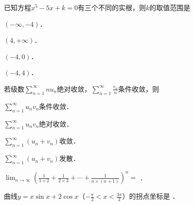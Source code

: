 \documentclass[plain,noanswer,medmath]{../../template/jnuexam}
\begin{document}








\begin{problem}
已知方程$x^5 - 5x + k = 0$有三个不同的实根，则$k$的取值范围是\pickout{}
\begin{abcd}
\item $(-\infty , - 4)$．
\item $(4, +\infty)$．
\item $(- 4,0)$．
\item $(- 4,4)$．
\end{abcd}
\end{problem}




\begin{problem}
若级数$\sum_{n = 1}^{\infty}nu_n$绝对收敛，$\sum_{n = 1}^{\infty}\frac{v_n}{n}$条件收敛，则\pickout{}
\begin{abcd}
\item $\sum_{n = 1}^{\infty}u_n v_n$条件收敛．
\item $\sum_{n = 1}^{\infty}u_n v_n$绝对收敛．
\item $\sum_{n = 1}^{\infty}(u_n + v_n)$收敛．
\item $\sum_{n = 1}^{\infty}(u_n + v_n)$发散．
\end{abcd}
\end{problem}












\begin{problem}
$\lim_{n \to \infty} \left(\frac{1}{1 \times 2} + \frac{1}{2 \times 3} + \cdots
 + \frac{1}{n \times(n + 1)} \right)^n =$ \fillin{}．
\end{problem}


\begin{problem}%
曲线$y = x\sin x + 2\cos x$（$- \frac{\pi}{2} < x < \frac{3\pi}{2}$）的拐点坐标是 \fillin{}．
\end{problem}
\end{document}
